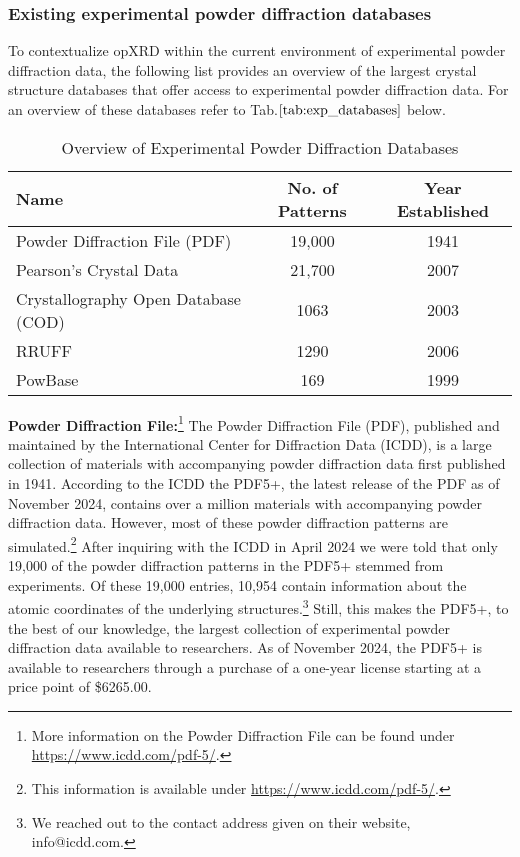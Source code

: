 \pagebreak

\subsubsection*{Existing experimental powder diffraction databases}
To contextualize opXRD within the current environment of experimental powder diffraction data, the following list provides an overview of the largest crystal structure databases that offer access to experimental powder diffraction data. For an overview of these databases refer to Tab.$\eqref{tab:exp_databases}$ below.\\

\begin{table}[!htb]
\centering
\caption{Overview of Experimental Powder Diffraction Databases}
\label{tab:exp_databases}
\begin{tabular}{@{}lcc@{}}
\toprule
\textbf{Name}                          & \textbf{No. of Patterns} & \textbf{Year Established} \\
\midrule
Powder Diffraction File (PDF)          & 19,000                  & 1941                      \\
Pearson's Crystal Data                 & 21,700                  & 2007        \\
Crystallography Open Database (COD)    & 1063                    & 2003                      \\
RRUFF                                  & 1290                    & 2006                      \\
PowBase                                & 169                     & 1999                      \\
\bottomrule
\end{tabular}
\end{table}

\textbf{Powder Diffraction File:}\footnote{More information on the Powder Diffraction File can be found under \url{https://www.icdd.com/pdf-5/}.} The Powder Diffraction File (PDF), published and maintained by the International Center for Diffraction Data (ICDD), is a large collection of materials with accompanying powder diffraction data first published in 1941\cite{GatesRector2019}. According to the ICDD the PDF5+, the latest release of the PDF as of November 2024, contains over a million materials with accompanying powder diffraction data. However, most of these powder diffraction patterns are simulated.\footnote{This information is available under \url{https://www.icdd.com/pdf-5/}.} After inquiring with the ICDD in April 2024 we were told that only 19,000 of the powder diffraction patterns in the PDF5+ stemmed from experiments. Of these 19,000 entries, 10,954 contain information about the atomic coordinates of the underlying structures.\footnote{We reached out to the contact address given on their website, info@icdd.com.} Still, this makes the PDF5+, to the best of our knowledge, the largest collection of experimental powder diffraction data available to researchers. As of November 2024, the PDF5+ is available to researchers through a purchase of a one-year license starting at a price point of \$6265.00.\\

